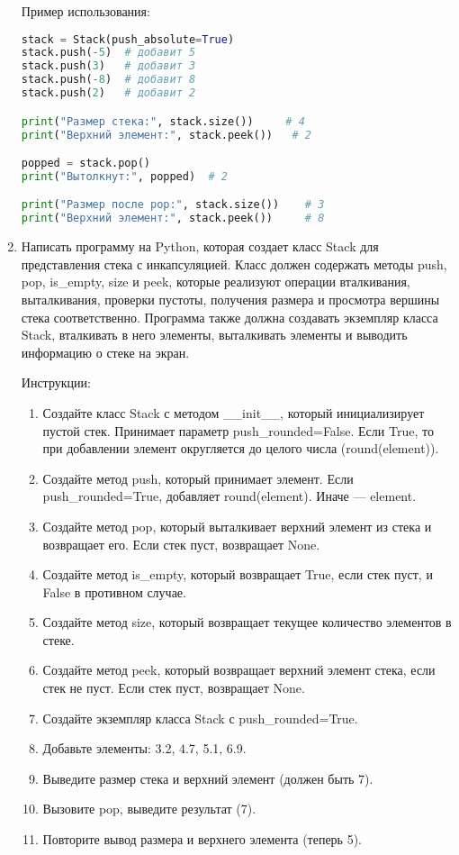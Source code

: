 \begin{enumerate}
Пример использования:
\begin{lstlisting}[language=Python]
stack = Stack(push_absolute=True)
stack.push(-5)  # добавит 5
stack.push(3)   # добавит 3
stack.push(-8)  # добавит 8
stack.push(2)   # добавит 2

print("Размер стека:", stack.size())     # 4
print("Верхний элемент:", stack.peek())   # 2

popped = stack.pop()
print("Вытолкнут:", popped)  # 2

print("Размер после pop:", stack.size())    # 3
print("Верхний элемент:", stack.peek())     # 8
\end{lstlisting}

\item Написать программу на Python, которая создает класс Stack для представления стека с инкапсуляцией. Класс должен содержать методы push, pop, is\_empty, size и peek, которые реализуют операции вталкивания, выталкивания, проверки пустоты, получения размера и просмотра вершины стека соответственно. Программа также должна создавать экземпляр класса Stack, вталкивать в него элементы, выталкивать элементы и выводить информацию о стеке на экран.

Инструкции:
\begin{enumerate}
    \item Создайте класс Stack с методом \_\_init\_\_, который инициализирует пустой стек. Принимает параметр push\_rounded=False. Если True, то при добавлении элемент округляется до целого числа (round(element)).
    \item Создайте метод push, который принимает элемент. Если push\_rounded=True, добавляет round(element). Иначе — element.
    \item Создайте метод pop, который выталкивает верхний элемент из стека и возвращает его. Если стек пуст, возвращает None.
    \item Создайте метод is\_empty, который возвращает True, если стек пуст, и False в противном случае.
    \item Создайте метод size, который возвращает текущее количество элементов в стеке.
    \item Создайте метод peek, который возвращает верхний элемент стека, если стек не пуст. Если стек пуст, возвращает None.
    \item Создайте экземпляр класса Stack с push\_rounded=True.
    \item Добавьте элементы: 3.2, 4.7, 5.1, 6.9.
    \item Выведите размер стека и верхний элемент (должен быть 7).
    \item Вызовите pop, выведите результат (7).
    \item Повторите вывод размера и верхнего элемента (теперь 5).
\end{enumerate}


\end{enumerate}
